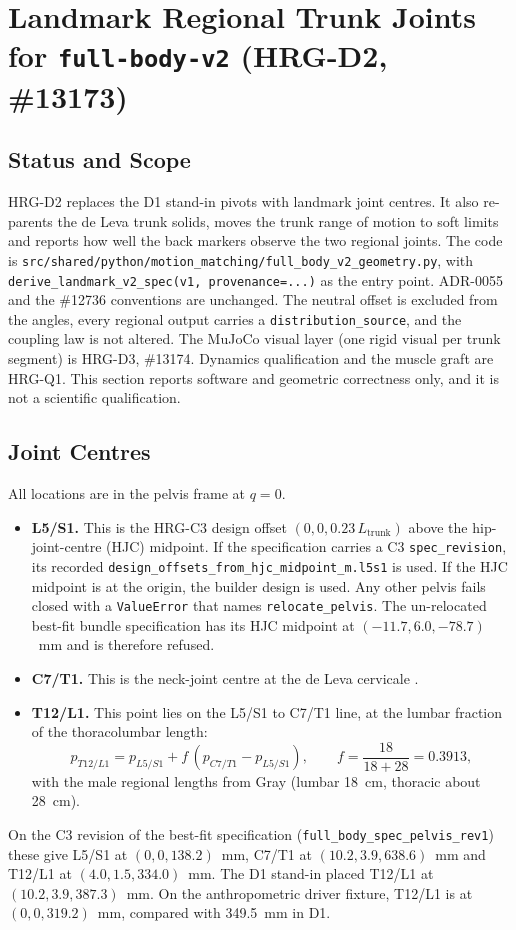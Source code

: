 \documentclass[11pt,a4paper]{article}
\begin{document}
\section{Landmark Regional Trunk Joints for \texttt{full-body-v2} (HRG-D2, \#13173)}
\label{sec:hrg-d2}

\subsection{Status and Scope}
HRG-D2 replaces the D1 stand-in pivots with landmark joint centres. It also
re-parents the de Leva trunk solids, moves the trunk range of motion to soft
limits and reports how well the back markers observe the two regional joints.
The code is \texttt{src/shared/python/motion\_matching/full\_body\_v2\_geometry.py},
with \texttt{derive\_landmark\_v2\_spec(v1, provenance=...)} as the entry
point. ADR-0055 and the \#12736 conventions are unchanged. The neutral offset
is excluded from the angles, every regional output carries a
\texttt{distribution\_source}, and the coupling law is not altered. The MuJoCo
visual layer (one rigid visual per trunk segment) is HRG-D3, \#13174. Dynamics qualification and the muscle graft are
HRG-Q1. This section reports software and geometric correctness only, and it
is not a scientific qualification.

\subsection{Joint Centres}
All locations are in the pelvis frame at $q=0$.
\begin{itemize}
\item \textbf{L5/S1.} This is the HRG-C3 design offset
$(0,0,0.23\,L_\mathrm{trunk})$ above the hip-joint-centre (HJC) midpoint. If
the specification carries a C3 \texttt{spec\_revision}, its recorded
\texttt{design\_offsets\_from\_hjc\_midpoint\_m.l5s1} is used. If the HJC
midpoint is at the origin, the builder design is used. Any other pelvis fails
closed with a \texttt{ValueError} that names \texttt{relocate\_pelvis}. The
un-relocated best-fit bundle specification has its HJC midpoint at
$(-11.7, 6.0, -78.7)$~mm and is therefore refused.
\item \textbf{C7/T1.} This is the neck-joint centre at the de Leva
cervicale \cite{deLeva1996}.
\item \textbf{T12/L1.} This point lies on the L5/S1 to C7/T1 line, at the
lumbar fraction of the thoracolumbar length:
\[
p_{T12/L1} = p_{L5/S1} + f\,(p_{C7/T1} - p_{L5/S1}), \qquad
f = \frac{18}{18+28} = 0.3913,
\]
with the male regional lengths from Gray \cite{Gray1918} (lumbar 18~cm,
thoracic about 28~cm).
\end{itemize}
On the C3 revision of the best-fit specification
(\texttt{full\_body\_spec\_pelvis\_rev1}) these give L5/S1 at
$(0, 0, 138.2)$~mm, C7/T1 at $(10.2, 3.9, 638.6)$~mm and T12/L1 at
$(4.0, 1.5, 334.0)$~mm. The D1 stand-in placed T12/L1 at
$(10.2, 3.9, 387.3)$~mm. On the anthropometric driver fixture, T12/L1 is at
$(0, 0, 319.2)$~mm, compared with 349.5~mm in D1.
\end{document}
